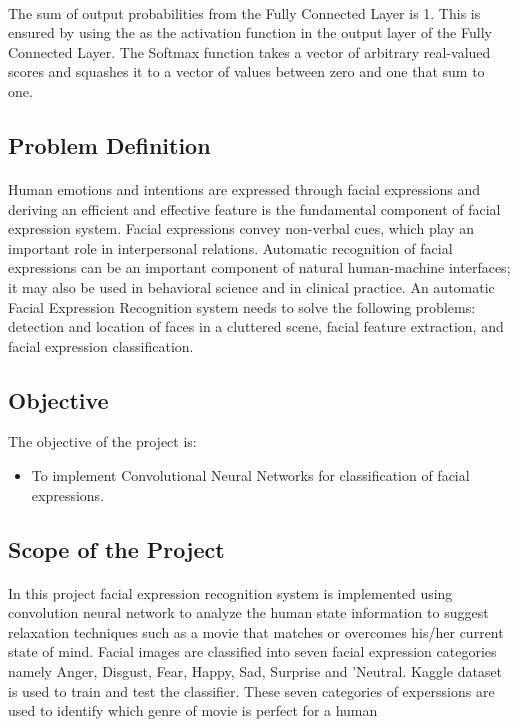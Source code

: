 \documentclass[a4paper,12pt,oneside]{article}
\begin{document}
\paragraph{}
﻿The sum of output probabilities from the Fully Connected Layer is 1. This is ensured by using
the  as the activation function in the output layer of the Fully Connected Layer. The Softmax
function takes a vector of arbitrary real-valued scores and squashes it to a vector of values
between zero and one that sum to one.

\subsection{Problem Definition}
\paragraph{}
﻿Human emotions and intentions are expressed through facial expressions and deriving an
efficient and effective feature is the fundamental component of facial expression system. Facial
expressions  convey  non-verbal  cues,  which play  an  important  role  in  interpersonal
relations.  Automatic recognition of facial expressions can be an important component of
natural  human-machine  interfaces;  it  may  also  be  used  in behavioral  science  and  in
clinical  practice. An automatic Facial Expression Recognition system needs to solve the
following problems: detection and location of faces in a cluttered scene, facial feature
extraction, and facial expression classification.
\subsection{Objective}
﻿The objective of the project is:

\begin{itemize}
	\item ﻿To implement Convolutional Neural Networks for classification of facial expressions.
\end{itemize}

\subsection{Scope of the Project}
\paragraph{}
﻿In this project facial expression recognition system is implemented using convolution neural
network to analyze the human state information to suggest  relaxation techniques such as a movie that matches or overcomes his/her current state of mind. Facial images are classified into seven facial expression categories namely Anger,
Disgust, Fear, Happy, Sad, Surprise and 'Neutral. Kaggle dataset is used to train and test the
classifier. These seven categories of experssions are used to identify which genre of movie is perfect for a human
\end{document}
